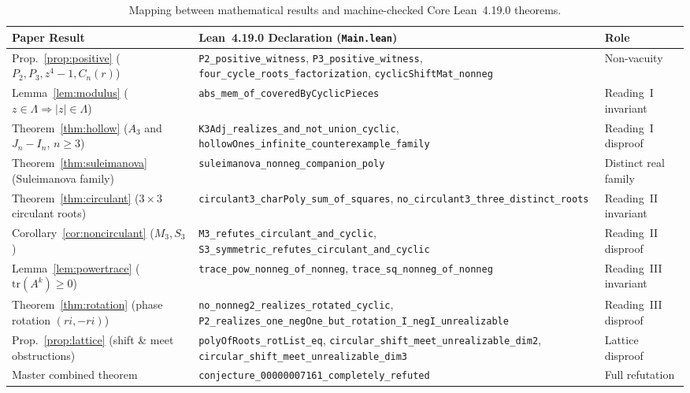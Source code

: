 \documentclass[11pt]{article}
\theoremstyle{definition}
\theoremstyle{remark}
\begin{document}
\begin{table}[ht]
\centering
\footnotesize
\begin{tabular}{@{}>{\raggedright\arraybackslash}p{}>{\raggedright\arraybackslash}p{}>{\raggedright\arraybackslash}p{}@{}}
\toprule
\textbf{Paper Result} & \textbf{Lean~4.19.0 Declaration (\texttt{Main.lean})} & \textbf{Role} \\
\midrule
Prop.~\ref{prop:positive} ($P_2, P_3, z^4-1, C_n(r)$) &
  \texttt{P2\_positive\_witness}, \texttt{P3\_positive\_witness},
  \texttt{four\_cycle\_\allowbreak roots\_factorization}, \texttt{cyclicShiftMat\_nonneg} &
  Non-vacuity \\
Lemma~\ref{lem:modulus} ($z \in \Lambda \Rightarrow |z| \in \Lambda$) &
  \texttt{abs\_mem\_of\_\allowbreak coveredByCyclicPieces} &
  Reading~I invariant \\
Theorem~\ref{thm:hollow} ($A_3$ and $J_n - I_n$, $n \ge 3$) &
  \texttt{K3Adj\_realizes\_\allowbreak and\_not\_union\_cyclic},
  \texttt{hollowOnes\_infinite\_\allowbreak counterexample\_family} &
  Reading~I disproof \\
Theorem~\ref{thm:suleimanova} (Suleimanova family) &
  \texttt{suleimanova\_nonneg\_\allowbreak companion\_poly} &
  Distinct real family \\
Theorem~\ref{thm:circulant} ($3 \times 3$ circulant roots) &
  \texttt{circulant3\_charPoly\_\allowbreak sum\_of\_squares},
  \texttt{no\_circulant3\_\allowbreak three\_distinct\_roots} &
  Reading~II invariant \\
Corollary~\ref{cor:noncirculant} ($M_3, S_3$) &
  \texttt{M3\_refutes\_\allowbreak circulant\_and\_cyclic},
  \texttt{S3\_symmetric\_refutes\_\allowbreak circulant\_and\_cyclic} &
  Reading~II disproof \\
Lemma~\ref{lem:powertrace} ($\mathrm{tr}(A^k) \ge 0$) &
  \texttt{trace\_pow\_nonneg\_of\_nonneg}, \texttt{trace\_sq\_\allowbreak nonneg\_of\_nonneg} &
  Reading~III invariant \\
Theorem~\ref{thm:rotation} (phase rotation $(ri,-ri)$) &
  \texttt{no\_nonneg2\_realizes\_\allowbreak rotated\_cyclic},
  \texttt{P2\_realizes\_one\_negOne\_\allowbreak but\_rotation\_I\_negI\_\allowbreak unrealizable} &
  Reading~III disproof \\
Prop.~\ref{prop:lattice} (shift \& meet obstructions) &
  \texttt{polyOfRoots\_rotList\_eq},
  \texttt{circular\_shift\_meet\_\allowbreak unrealizable\_dim2},
  \texttt{circular\_shift\_meet\_\allowbreak unrealizable\_dim3} &
  Lattice disproof \\
Master combined theorem &
  \texttt{conjecture\_00000007161\_\allowbreak completely\_refuted} &
  Full refutation \\
\bottomrule
\end{tabular}
\caption{Mapping between mathematical results and machine-checked Core Lean~4.19.0 theorems.}
\label{tab:lean}
\end{table}
\end{document}
